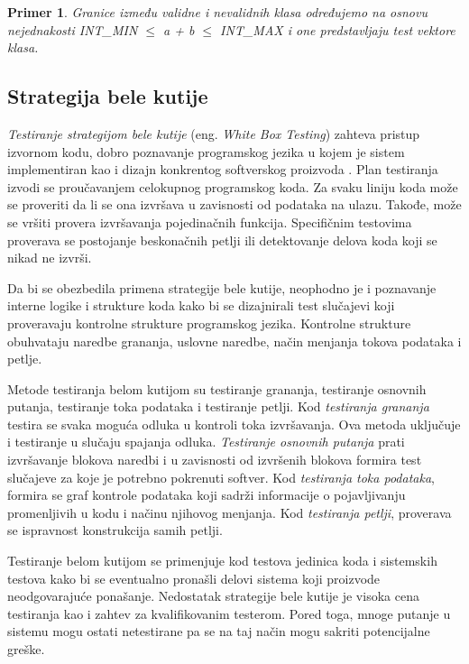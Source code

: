 \documentclass[12pt,oneside]{memoir}
\newtheorem{primer}{Primer}
\begin{document}
\begin{primer} \label{exbva} Granice između validne i nevalidnih klasa određujemo na osnovu nejednakosti INT\_MIN $\leq$ a + b $\leq$ INT\_MAX i one predstavljaju test vektore klasa.


\end{primer}
 
\subsection{Strategija bele kutije}
\emph{Testiranje strategijom bele kutije} (eng. \textit{White Box Testing}) zahteva pristup izvornom kodu, dobro poznavanje programskog jezika u kojem je sistem implementiran kao i dizajn konkrentog softverskog proizvoda \cite{WhiteBoxTesting}. Plan testiranja izvodi se proučavanjem celokupnog programskog koda. Za svaku liniju koda može se proveriti da li se ona izvršava u zavisnosti od podataka na ulazu. Takođe, može se vršiti provera izvršavanja pojedinačnih funkcija. Specifičnim testovima proverava se postojanje beskonačnih petlji ili detektovanje delova koda koji se nikad ne izvrši. 
\par
Da bi se obezbedila primena strategije bele kutije, neophodno je i poznavanje interne logike i strukture koda kako bi se dizajnirali test slučajevi koji proveravaju kontrolne strukture programskog jezika. Kontrolne strukture obuhvataju naredbe grananja, uslovne naredbe, način menjanja tokova podataka i petlje.

Metode testiranja belom kutijom su testiranje grananja, testiranje osnovnih putanja, testiranje toka podataka i testiranje petlji.
Kod \emph{testiranja grananja} testira se svaka moguća odluka u kontroli toka izvršavanja. Ova metoda uključuje i testiranje u slučaju spajanja odluka.  
\emph{Testiranje osnovnih putanja} prati izvršavanje blokova naredbi i u zavisnosti od izvršenih blokova formira test slučajeve za koje je potrebno pokrenuti softver. Kod \emph{testiranja toka podataka}, formira se graf kontrole podataka koji sadrži informacije o pojavljivanju promenljivih u kodu i načinu njihovog menjanja. Kod \emph{testiranja petlji}, proverava se ispravnost konstrukcija samih petlji.

Testiranje belom kutijom se primenjuje kod testova jedinica koda i sistemskih testova kako bi se eventualno pronašli delovi sistema koji proizvode neodgovarajuće ponašanje.
Nedostatak strategije bele kutije je visoka cena testiranja kao i zahtev za kvalifikovanim testerom. Pored toga,
mnoge putanje u sistemu mogu ostati netestirane pa se na taj način mogu sakriti potencijalne greške. 
\end{document}
